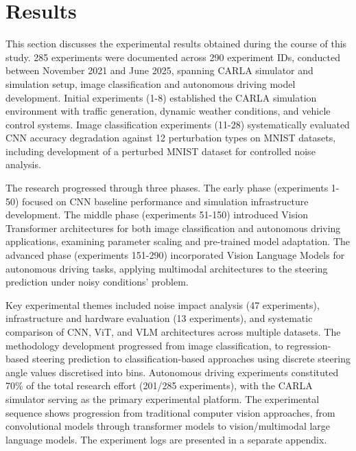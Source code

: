 \chapter{Results}
\label{Results} 



This section discusses the experimental results obtained during the course of this study. 285 experiments were documented across 290 experiment IDs, conducted between November 2021 and June 2025, spanning CARLA simulator and simulation setup, image classification and autonomous driving model development. Initial experiments (1-8) established the CARLA simulation environment with traffic generation, dynamic weather conditions, and vehicle control systems. Image classification experiments (11-28) systematically evaluated CNN accuracy degradation against 12 perturbation types on MNIST datasets, including development of a perturbed MNIST dataset for controlled noise analysis.

The research progressed through three phases. The early phase (experiments 1-50) focused on CNN baseline performance and simulation infrastructure development. The middle phase (experiments 51-150) introduced Vision Transformer architectures for both image classification and autonomous driving applications, examining parameter scaling and pre-trained model adaptation. The advanced phase (experiments 151-290) incorporated Vision Language Models for autonomous driving tasks, applying multimodal architectures to the steering prediction under noisy conditions' problem.

Key experimental themes included noise impact analysis (47 experiments), infrastructure and hardware evaluation (13 experiments), and systematic comparison of CNN, ViT, and VLM architectures across multiple datasets. The methodology development progressed from image classification, to regression-based steering prediction to classification-based approaches using discrete steering angle values discretised into bins. Autonomous driving experiments constituted 70\% of the total research effort (201/285 experiments), with the CARLA simulator serving as the primary experimental platform. The experimental sequence shows progression from traditional computer vision approaches, from convolutional models through transformer models to vision/multimodal large language models. The experiment logs are presented in a separate appendix.

